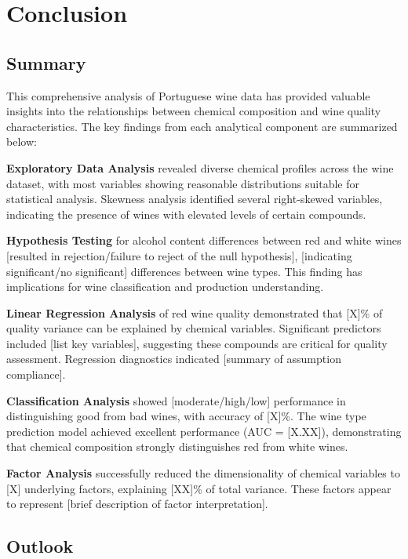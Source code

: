 \chapter{Conclusion}

\section{Summary}

This comprehensive analysis of Portuguese wine data has provided valuable insights into the relationships between chemical composition and wine quality characteristics. The key findings from each analytical component are summarized below:

\textbf{Exploratory Data Analysis} revealed diverse chemical profiles across the wine dataset, with most variables showing reasonable distributions suitable for statistical analysis. Skewness analysis identified several right-skewed variables, indicating the presence of wines with elevated levels of certain compounds.

\textbf{Hypothesis Testing} for alcohol content differences between red and white wines [resulted in rejection/failure to reject of the null hypothesis], [indicating significant/no significant] differences between wine types. This finding has implications for wine classification and production understanding.

\textbf{Linear Regression Analysis} of red wine quality demonstrated that [X]\% of quality variance can be explained by chemical variables. Significant predictors included [list key variables], suggesting these compounds are critical for quality assessment. Regression diagnostics indicated [summary of assumption compliance].

\textbf{Classification Analysis} showed [moderate/high/low] performance in distinguishing good from bad wines, with accuracy of [X]\%. The wine type prediction model achieved excellent performance (AUC = [X.XX]), demonstrating that chemical composition strongly distinguishes red from white wines.

\textbf{Factor Analysis} successfully reduced the dimensionality of chemical variables to [X] underlying factors, explaining [XX]\% of total variance. These factors appear to represent [brief description of factor interpretation].

\section{Outlook}

